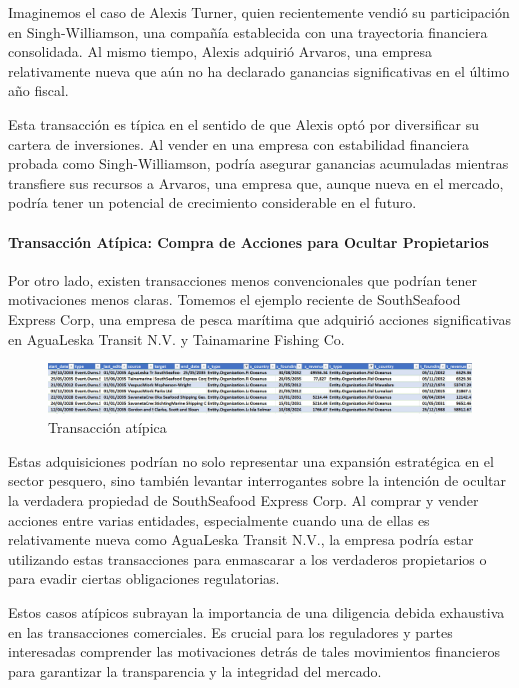 \documentclass[11pt,spanish,a4paper]{article}
\begin{document}
Imaginemos el caso de Alexis Turner, quien recientemente vendió su participación en Singh-Williamson, una compañía establecida con una trayectoria financiera consolidada. Al mismo tiempo, Alexis adquirió Arvaros, una empresa relativamente nueva que aún no ha declarado ganancias significativas en el último año fiscal.

Esta transacción es típica en el sentido de que Alexis optó por diversificar su cartera de inversiones. Al vender en una empresa con estabilidad financiera probada como Singh-Williamson, podría asegurar ganancias acumuladas mientras transfiere sus recursos a Arvaros, una empresa que, aunque nueva en el mercado, podría tener un potencial de crecimiento considerable en el futuro.

\paragraph{Transacción Atípica: Compra de Acciones para Ocultar Propietarios}
Por otro lado, existen transacciones menos convencionales que podrían tener motivaciones menos claras. Tomemos el ejemplo reciente de SouthSeafood Express Corp, una empresa de pesca marítima que adquirió acciones significativas en AguaLeska Transit N.V. y Tainamarine Fishing Co.

\begin{figure}[H]
    \centering
    \includegraphics[width=1\linewidth]{graphs/ejercicio_2_2.png}
    \caption{Transacción atípica}
    \label{fig:enter-label5}
\end{figure}

Estas adquisiciones podrían no solo representar una expansión estratégica en el sector pesquero, sino también levantar interrogantes sobre la intención de ocultar la verdadera propiedad de SouthSeafood Express Corp. Al comprar y vender acciones entre varias entidades, especialmente cuando una de ellas es relativamente nueva como AguaLeska Transit N.V., la empresa podría estar utilizando estas transacciones para enmascarar a los verdaderos propietarios o para evadir ciertas obligaciones regulatorias.

Estos casos atípicos subrayan la importancia de una diligencia debida exhaustiva en las transacciones comerciales. Es crucial para los reguladores y partes interesadas comprender las motivaciones detrás de tales movimientos financieros para garantizar la transparencia y la integridad del mercado.
\end{document}
